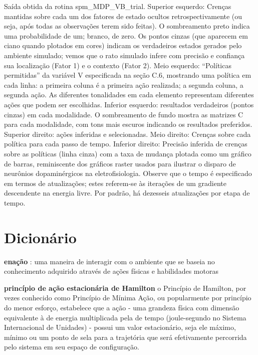 \documentclass[
  12pt,
]{book}
\begin{document}
Saída obtida da rotina spm\_MDP\_VB\_trial. Superior esquerdo: Crenças mantidas sobre cada um dos fatores de estado ocultos retrospectivamente (ou seja, após todas as observações terem sido feitas). O sombreamento preto indica uma probabilidade de um; branco, de zero. Os pontos cinzas (que aparecem em ciano quando plotados em cores) indicam os verdadeiros estados gerados pelo ambiente simulado; vemos que o rato simulado infere com precisão e confiança sua localização (Fator 1) e o contexto (Fator 2). Meio esquerdo: ``Políticas permitidas'' da variável V especificada na seção C.6, mostrando uma política em cada linha: a primeira coluna é a primeira ação realizada; a segunda coluna, a segunda ação. As diferentes tonalidades em cada elemento representam diferentes ações que podem ser escolhidas. Inferior esquerdo: resultados verdadeiros (pontos cinzas) em cada modalidade. O sombreamento de fundo mostra as matrizes C para cada modalidade, com tons mais escuros indicando os resultados preferidos. Superior direito: ações inferidas e selecionadas. Meio direito: Crenças sobre cada política para cada passo de tempo. Inferior direito: Precisão inferida de crenças sobre as políticas (linha cinza) com a taxa de mudança plotada como um gráfico de barras, reminiscente dos gráficos raster usados \hspace{0pt}\hspace{0pt}para ilustrar o disparo de neurônios dopaminérgicos na eletrofisiologia. Observe que o tempo é especificado em termos de atualizações; estes referem-se às iterações de um gradiente descendente na energia livre. Por padrão, há dezesseis atualizações por etapa de tempo.

\cleardoublepage

\hypertarget{dicionuxe1rio}{%
\chapter*{Dicionário}\label{dicionuxe1rio}}

\textbf{enação} : uma maneira de interagir com o ambiente que se baseia no conhecimento adquirido através de ações físicas e habilidades motoras

\textbf{princípio de ação estacionária de Hamilton} o Princípio de Hamilton, por vezes conhecido como Princípio de Mínima Ação, ou popularmente por princípio do menor esforço, estabelece que a ação - uma grandeza física com dimensão equivalente à de energia multiplicada pela de tempo (joule-segundo no Sistema Internacional de Unidades) - possui um valor estacionário, seja ele máximo, mínimo ou um ponto de sela para a trajetória que será efetivamente percorrida pelo sistema em seu espaço de configuração.
\end{document}
